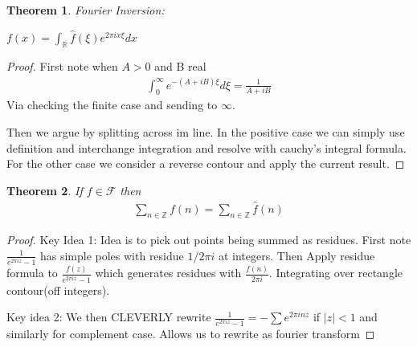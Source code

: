 \documentclass[11pt]{article}
\newcommand{\Z}{\mathbb{Z}}
\newtheorem{theorem}{Theorem}
\theoremstyle{remark}
\begin{document}
\begin{theorem}Fourier Inversion:

	$f(x) = \int_{\mathbb{R}} \hat{f}(\xi) e^{2\pi i x \xi}dx$
\end{theorem}

\begin{proof}
	First note when $A > 0$ and B real
	\begin{align*}
		\int_0^{\infty} e^{-(A+iB)\xi}d\xi = \frac{1}{A+iB}
	\end{align*}
	Via checking the finite case and sending to $\infty$. 

	Then we argue by splitting across im line. In the positive case we can simply use definition and interchange integration and resolve with cauchy's integral formula. For the other case we consider a reverse contour and apply the current result.
\end{proof}
	
\begin{theorem}
	If $f \in \mathcal{F}$ then
	\begin{align*}
		\sum_{n \in \Z} f(n) = \sum_{n \in \Z} \hat{f}(n)
	\end{align*}	
\end{theorem}

\begin{proof}
	Key Idea 1: Idea is to pick out points being summed as residues. First note $\frac{1}{e^{2\pi i z}-1}$ has simple poles with residue $1/2\pi i $ at integers. Then Apply residue formula to $\frac{f(z)}{e^{2\pi i z}-1}$ which generates residues with $\frac{f(n)}{2\pi i}$. Integrating over rectangle contour(off integers). 

	Key idea 2: We then CLEVERLY rewrite $\frac{1}{e^{2\pi i z}-1} = -\sum e^{2\pi i n z}$ if $|z| < 1$ and similarly for complement case. Allows us to rewrite as fourier transform 
\end{proof}
\end{document}
